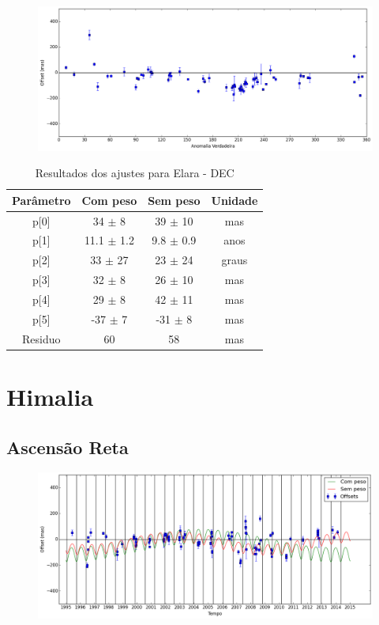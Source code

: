 \documentclass[11pt,a4paper]{report}
\begin{document}
\begin{figure}[h]
\includegraphics[scale=0.45]{Elara/DEC_anom.png}  
\end{figure}

\begin{table}[h!]
\caption{\label{Tab: Elara-DEC} Resultados dos ajustes para Elara - DEC}
\begin{centering}
\begin{tabular}{cccc}
\hline
\hline
Parâmetro & Com peso & Sem peso & Unidade\tabularnewline
\hline
p[0] & 34 $\pm$ 8 & 39 $\pm$ 10 & mas\\
p[1] & 11.1 $\pm$ 1.2 & 9.8 $\pm$ 0.9 & anos\\
p[2] & 33 $\pm$ 27 & 23 $\pm$ 24 & graus\\
p[3] & 32 $\pm$ 8 & 26 $\pm$ 10 & mas\\
p[4] & 29 $\pm$ 8 & 42 $\pm$ 11 & mas\\
p[5] & -37 $\pm$ 7 & -31 $\pm$ 8 & mas\\
Residuo & 60 & 58 & mas\\
\hline 
\end{tabular} 
\par\end{centering}
\end{table}

\chapter*{Himalia}
\section*{Ascensão Reta}

\begin{figure}[h]
\includegraphics[scale=0.45]{Himalia/RA.png} 
\end{figure}
\end{document}
